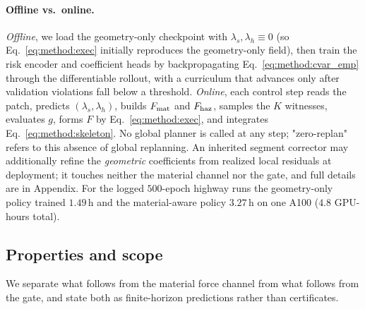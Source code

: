 \paragraph{Offline vs.\ online.} \emph{Offline}, we load the geometry-only checkpoint with $\lambda_s,\lambda_h\equiv0$ (so Eq.~\eqref{eq:method:exec} initially reproduces the geometry-only field), then train the risk encoder and coefficient heads by backpropagating Eq.~\eqref{eq:method:cvar_emp} through the differentiable rollout, with a curriculum that advances only after validation violations fall below a threshold. \emph{Online}, each control step reads the patch, predicts $(\lambda_s,\lambda_h)$, builds $F_{\rm mat}$ and $F_{\rm haz}$, samples the $K$ witnesses, evaluates $g$, forms $F$ by Eq.~\eqref{eq:method:exec}, and integrates Eq.~\eqref{eq:method:skeleton}. No global planner is called at any step; "zero-replan" refers to this absence of global replanning. An inherited segment corrector may additionally refine the \emph{geometric} coefficients from realized local residuals at deployment; it touches neither the material channel nor the gate, and full details are in Appendix. For the logged $500$-epoch highway runs the geometry-only policy trained $1.49$\,h and the material-aware policy $3.27$\,h on one A100 ($4.8$ GPU-hours total).

\subsection{Properties and scope}
\label{sec:method:props}

We separate what follows from the material force channel from what follows from the gate, and state both as finite-horizon predictions rather than certificates.

